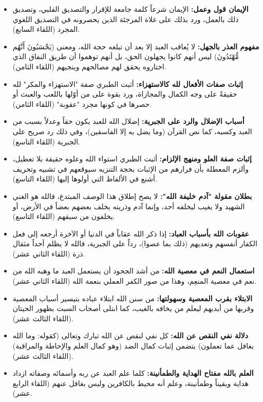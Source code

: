 \begin{itemize}
    \item \textbf{الإيمان قول وعمل:} الإيمان شرعاً كلمة جامعة للإقرار والتصديق القلبي، وتصديق ذلك بالعمل، ورد بذلك على غلاة المرجئة الذين يحصرونه في التصديق اللغوي المجرد (اللقاء السابع).
    \item \textbf{مفهوم العذر بالجهل:} لا يُعاقب العبد إلا بعد أن تبلغه حجة الله، ومعنى (يَحْسَبُونَ أَنَّهُم مُّهْتَدُونَ) ليس أنهم كانوا يجهلون الحق، بل أنهم توهموا أن طريق النفاق الذي اختاروه يحقق لهم مصالحهم وينجيهم (اللقاء الثامن).
    \item \textbf{إثبات صفات الأفعال لله كالاستهزاء:} أثبت الطبري صفة "الاستهزاء والمكر" لله حقيقةً على وجه الكمال والمجازاة، ورد بقوة على من أوّلها باللعب والعبث أو حصرها في كونها مجرد "عقوبة" (اللقاء الثامن).
    \item \textbf{أسباب الإضلال والرد على الجبرية:} إضلال الله للعبد يكون حقاً وعدلاً بسبب من العبد وكسبه، كما نص القرآن (وما يضل به إلا الفاسقين)، وفي ذلك رد صريح على الجبرية (اللقاء التاسع).
    \item \textbf{إثبات صفة العلو ومنهج الإلزام:} أثبت الطبري استواء الله وعلوه حقيقة بلا تعطيل، وألزم المعطلة بأن فرارهم من الإثبات بحجة التنزيه سيوقعهم في تشبيه وتحريف أشنع في الألفاظ التي أولوها إليها (اللقاء التاسع).
    \item \textbf{بطلان مقولة "آدم خليفة الله":} لا يصح إطلاق هذا الوصف المبتدع، فالله هو الغني الشهيد ولا يغيب ليخلفه أحد، وإنما آدم وذريته يخلف بعضهم بعضاً في الأرض، أو يخلفون من سبقهم (اللقاء التاسع).
    \item \textbf{عقوبات الله بأسباب العباد:} إذا ذكر الله عقاباً في الدنيا أو الآخرة أرجعه إلى فعل الكفار أنفسهم وتعديهم (ذلك بما عصوا)، رداً على الجبرية، فالله لا يظلم أحداً مثقال ذرة (اللقاء الثاني عشر).
    \item \textbf{استعمال النعم في معصية الله:} من أشد الجحود أن يستعمل العبد ما وهبه الله من نعم في معصية المنعِم، وهذا من صور الكفر العملي بنعمة الله (اللقاء الثاني عشر).
    \item \textbf{الابتلاء بقرب المعصية وسهولتها:} من سنن الله ابتلاء عباده بتيسير أسباب المعصية وقربها من أيديهم ليعلم من يخافه بالغيب، كما ابتلى أصحاب السبت بظهور الحيتان (اللقاء الثالث عشر).
    \item \textbf{دلالة نفي النقص عن الله:} كل نفي لنقص عن الله تبارك وتعالى (كقوله: وما الله بغافل عما تعملون) يتضمن إثبات كمال الضد (وهو كمال العلم والإحاطة والمراقبة) (اللقاء الثالث عشر).
    \item \textbf{العلم بالله مفتاح الهداية والطمأنينة:} كلما علم العبد عن ربه وأسمائه وصفاته ازداد هداية ويقيناً وطمأنينة، وعلم أنه محيط بالكافرين وليس بغافل عنهم (اللقاء الرابع عشر).

\end{itemize}
